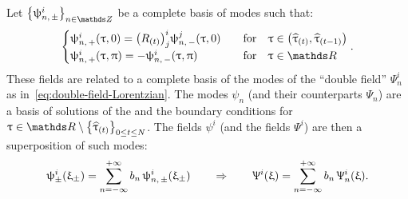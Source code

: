 Let $\qty{ \psi_{n,\, \pm}^i }_{n \in \Z}$ be a complete basis of modes such that:
\begin{equation}
  \begin{cases}
    \psi_{n,\, +}^i( \tau, 0 ) = \qty( R_{(t)} )^i_j \psi_{n,\, -}^j(
    \tau, 0 ) & \qfor \tau \in \qty( \htau_{(t)}, \htau_{(t-1)} )
    \\
    \psi_{n,\, +}^i( \tau, \pi ) = -\psi_{n,\, -}^i( \tau, \pi )
    & \qfor \tau \in \R
  \end{cases}.
\end{equation}
These fields are related to a complete basis of the modes of the ``double field'' $\Psi_n^i$ as in~\eqref{eq:double-field-Lorentzian}.
The modes $\psi_n$ (and their counterparts $\Psi_n$) are a basis of solutions of the \eom and the boundary conditions for $\tau \in \R \setminus \qty{ \htau_{(t)} }_{0 \le t \le N}$.
The fields $\psi^i$ (and the fields $\Psi^i$) are then a superposition of such modes:
\begin{equation}
  \uppsi^i_{\pm}( \upxi_{\pm} )
  =
  \sum\limits_{n = -\infty}^{+\infty} b_n\, \uppsi^i_{n,\, \pm}( \upxi_{\pm} )
  \qquad
  \Rightarrow
  \qquad
  \Uppsi^i( \upxi )
  =
  \sum\limits_{n = -\infty}^{+\infty} b_n\, \Uppsi^i_n( \upxi ).
\label{eq:usual-mode-expansion}
\end{equation}

